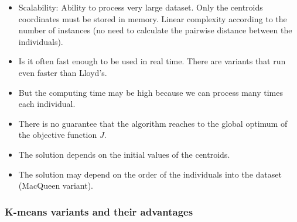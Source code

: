 \documentclass[a4paper]{article}
\begin{document}
\begin{multicols}{2}
\begin{itemize}
    \item[\textcolor{DarkPink}{\ding{51}}] Scalability: Ability to process very large dataset. Only the centroids coordinates must be stored in memory. Linear complexity according to the number of instances (no need to calculate the pairwise distance between the individuals).
    \item[\textcolor{DarkPink}{\ding{51}}] Is it often fast enough to be used in real time. There are variants that run even faster than Lloyd's.
\end{itemize}

\columnbreak
\begin{itemize}
    \item[\textcolor{DarkPink}{\ding{55}}] But the computing time may be high because we can process
many times each individual.
    \item[\textcolor{DarkPink}{\ding{55}}] There is no guarantee that the algorithm reaches to the global
optimum of the objective function $J$.
    \item[\textcolor{DarkPink}{\ding{55}}] The solution depends on the initial values of the centroids.
    \item[\textcolor{DarkPink}{\ding{55}}] The solution may depend on the order of the individuals into the
dataset (MacQueen variant).
\end{itemize}
\end{multicols}



\subsubsection{K-means variants and their advantages}
\end{document}
